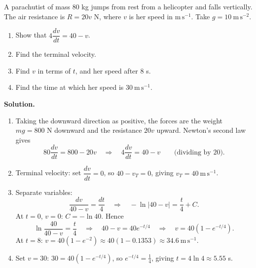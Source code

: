 \documentclass[11pt]{article}
\begin{document}
\begin{exoresolu}
A parachutist of mass $80$ kg jumps from rest from a helicopter and falls vertically. The air resistance is $R = 20v$ N, where $v$ is her speed in $\mathrm{m\,s^{-1}}$. Take $g = 10\ \mathrm{m\,s^{-2}}$.
\begin{enumerate}
\item Show that $4\dfrac{dv}{dt} = 40 - v$.
\item Find the terminal velocity.
\item Find $v$ in terms of $t$, and her speed after $8$ s.
\item Find the time at which her speed is $30\ \mathrm{m\,s^{-1}}$.
\end{enumerate}
\tcblower
\textbf{Solution.}
\begin{enumerate}
\item Taking the downward direction as positive, the forces are the weight $mg = 800$ N downward and the resistance $20v$ upward. Newton's second law gives
\[
80\frac{dv}{dt} = 800 - 20v \quad\Longrightarrow\quad 4\frac{dv}{dt} = 40 - v \qquad \text{(dividing by } 20\text{).}
\]
\item Terminal velocity: set $\dfrac{dv}{dt} = 0$, so $40 - v_T = 0$, giving $v_T = 40\ \mathrm{m\,s^{-1}}$.
\item Separate variables:
\[
\frac{dv}{40 - v} = \frac{dt}{4} \quad\Longrightarrow\quad -\ln|40 - v| = \frac{t}{4} + C.
\]
At $t = 0$, $v = 0$: $C = -\ln 40$. Hence
\[
\ln\frac{40}{40 - v} = \frac{t}{4} \quad\Longrightarrow\quad 40 - v = 40e^{-t/4} \quad\Longrightarrow\quad v = 40\left(1 - e^{-t/4}\right).
\]
At $t = 8$: $v = 40(1 - e^{-2}) \approx 40(1 - 0.1353) \approx 34.6\ \mathrm{m\,s^{-1}}$.
\item Set $v = 30$: $30 = 40(1 - e^{-t/4})$, so $e^{-t/4} = \tfrac{1}{4}$, giving $t = 4\ln 4 \approx 5.55$ s.
\end{enumerate}
\end{exoresolu}
\end{document}
